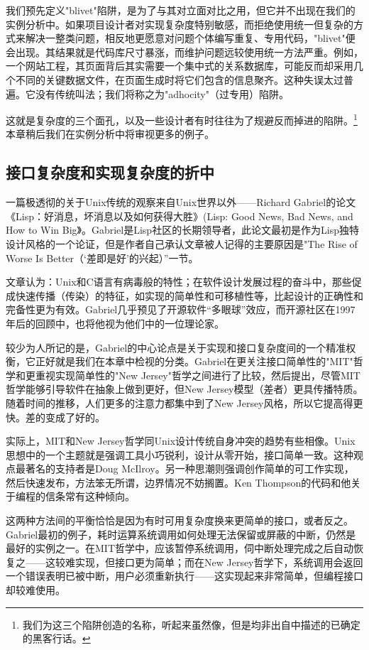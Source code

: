 \documentclass[12pt,oneside]{book}
\begin{document}
我们预先定义"blivet"陷阱，是为了与其对立面对比之用，但它并不出现在我们的实例分析中。如果项目设计者对实现复杂度特别敏感，而拒绝使用统一但复杂的方式来解决一整类问题，相反地更愿意对问题个体编写重复、专用代码，"blivet"便会出现。其结果就是代码库尺寸暴涨，而维护问题远较使用统一方法严重。例如，一个网站工程，其页面背后其实需要一个集中式的关系数据库，可能反而却采用几个不同的关键数据文件，在页面生成时将它们包含的信息聚齐。这种失误太过普遍。它没有传统叫法；我们将称之为"adhocity"（过专用）陷阱。

这就是复杂度的三个面孔，以及一些设计者有时往往为了规避反而掉进的陷阱。\footnote{我们为这三个陷阱创造的名称，听起来虽然像，但是均非出自\cite{Raymond96}中描述的已确定的黑客行话。}本章稍后我们在实例分析中将审视更多的例子。

\subsection{接口复杂度和实现复杂度的折中}
一篇极透彻的关于Unix传统的观察来自Unix世界以外——Richard Gabriel的论文《Lisp：好消息，坏消息以及如何获得大胜》(Lisp: Good News, Bad News, and How to Win Big》\cite{Gabriel}。Gabriel是Lisp社区的长期领导者，此论文最初是作为Lisp独特设计风格的一个论证，但是作者自己承认文章被人记得的主要原因是"The Rise of Worse Is Better（‘差即是好’的兴起）”一节。

文章认为：Unix和C语言有病毒般的特性；在软件设计发展过程的奋斗中，那些促成快速传播（传染）的特征，如实现的简单性和可移植性等，比起设计的正确性和完备性更为有效。Gabriel几乎预见了开源软件“多眼球”效应，而开源社区在1997年后的回顾中，也将他视为他们中的一位理论家。

较少为人所记的是，Gabriel的中心论点是关于实现和接口复杂度间的一个精准权衡，它正好就是我们在本章中检视的分类。Gabriel在更关注接口简单性的"MIT"哲学和更重视实现简单性的"New Jersey"哲学之间进行了比较，然后提出，尽管MIT哲学能够引导软件在抽象上做到更好，但New Jersey模型（差者）更具传播特质。随着时间的推移，人们更多的注意力都集中到了New Jersey风格，所以它提高得更快。差的变成了好的。

实际上，MIT和New Jersey哲学同Unix设计传统自身冲突的趋势有些相像。Unix思想中的一个主题就是强调工具小巧锐利，设计从零开始，接口简单一致。这种观点最著名的支持者是Doug McIlroy。另一种思潮则强调创作简单的可工作实现，然后快速发布，方法笨无所谓，边界情况不妨搁置。Ken Thompson的代码和他关于编程的信条常有这种倾向。

这两种方法间的平衡恰恰是因为有时可用复杂度换来更简单的接口，或者反之。Gabriel最初的例子，耗时运算系统调用如何处理无法保留或屏蔽的中断，仍然是最好的实例之一。在MIT哲学中，应该暂停系统调用，伺中断处理完成之后自动恢复之——这较难实现，但接口更为简单；而在New Jersey哲学下，系统调用会返回一个错误表明已被中断，用户必须重新执行——这实现起来非常简单，但编程接口却较难使用。
\end{document}
